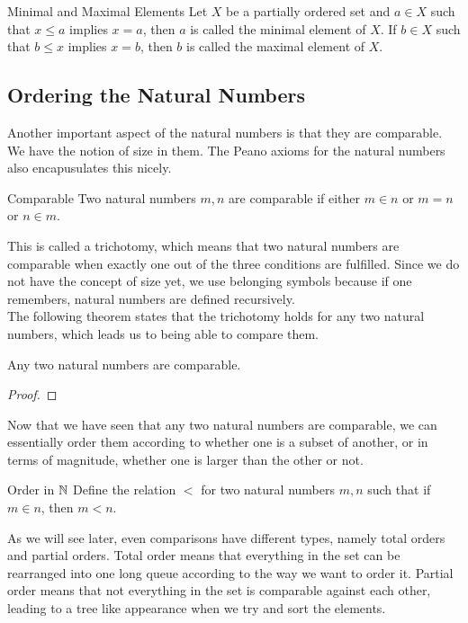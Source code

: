 \documentclass[a4paper]{article}
\begin{document}
\begin{defn}{Minimal and Maximal Elements}{} Let $X$ be a partially ordered set and $a\in X$ such that $x\leq a$ implies $x=a$, then $a$ is called the minimal element of $X$. If $b\in X$ such that $b\leq x$ implies $x=b$, then $b$ is called the maximal element of $X$. 
\end{defn}

\subsection{Ordering the Natural Numbers}
Another important aspect of the natural numbers is that they are comparable. We have the notion of size in them. The Peano axioms for the natural numbers also encapusulates this nicely. 

\begin{defn}{Comparable}{} Two natural numbers $m,n$ are comparable if either $m\in n$ or $m=n$ or $n\in m$. 
\end{defn}

This is called a trichotomy, which means that two natural numbers are comparable when exactly one out of the three conditions are fulfilled. Since we do not have the concept of size yet, we use belonging symbols because if one remembers, natural numbers are defined recursively. \\
The following theorem states that the trichotomy holds for any two natural numbers, which leads us to being able to compare them. 

\begin{thm}{}{} Any two natural numbers are comparable. 
\begin{proof}
\end{proof}
\end{thm}

Now that we have seen that any two natural numbers are comparable, we can essentially order them according to whether one is a subset of another, or in terms of magnitude, whether one is larger than the other or not. 

\begin{defn}{Order in $\mathbb{N}$}{} Define the relation $<$ for two natural numbers $m,n$ such that if $m\in n$, then $m<n$. 
\end{defn}

As we will see later, even comparisons have different types, namely total orders and partial orders. Total order means that everything in the set can be rearranged into one long queue according to the way we want to order it. Partial order means that not everything in the set is comparable against each other, leading to a tree like appearance when we try and sort the elements. 
\end{document}
